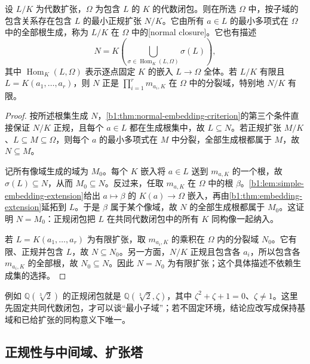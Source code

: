 \begin{proposition}\label{b1:prop:normal-closure}
	设 \(L/K\) 为代数扩张，\(\Omega\) 为包含 \(L\) 的 \(K\) 的代数闭包。则在所选 \(\Omega\) 中，按子域的包含关系存在包含 \(L\) 的最小正规扩张 \(N/K\)。它由所有 \(a\in L\) 的最小多项式在 \(\Omega\) 中的全部根生成，称为 \(L/K\) 在 \(\Omega\) 中的[normal closure]。它也有描述
	\[
		N=K\left(\bigcup_{\sigma\in\operatorname{Hom}_K(L,\Omega)}\sigma(L)\right),
	\]
	其中 \(\operatorname{Hom}_K(L,\Omega)\) 表示逐点固定 \(K\) 的嵌入 \(L\rightarrow\Omega\) 全体。若 \(L/K\) 有限且 \(L=K(a_1,\ldots,a_r)\)，则 \(N\) 正是 \(\prod_{i=1}^r m_{a_i,K}\) 在 \(\Omega\) 中的分裂域，特别地 \(N/K\) 有限。
\end{proposition}
\begin{proof}
	按所述根集生成 \(N\)，\cref{b1:thm:normal-embedding-criterion}的第三个条件直接保证 \(N/K\) 正规，且每个 \(a\in L\) 都在生成根集中，故 \(L\subseteq N\)。若正规扩张 \(M/K\)、\(L\subseteq M\subseteq\Omega\)，则每个 \(a\) 的最小多项式在 \(M\) 中分裂，全部生成根都属于 \(M\)，故 \(N\subseteq M\)。

	记所有像域生成的域为 \(M_0\)。每个 \(K\) 嵌入将 \(a\in L\) 送到 \(m_{a,K}\) 的一个根，故 \(\sigma(L)\subseteq N\)，从而 \(M_0\subseteq N\)。反过来，任取 \(m_{a,K}\) 在 \(\Omega\) 中的根 \(\beta\)。\cref{b1:lem:simple-embedding-extension}给出 \(a\mapsto\beta\) 的 \(K(a)\rightarrow\Omega\) 嵌入，再由\cref{b1:thm:embedding-extension}延拓到 \(L\)。于是 \(\beta\) 属于某个像域，故 \(N\) 的全部生成根都属于 \(M_0\)。这证明 \(N=M_0\)：正规闭包把 \(L\) 在共同代数闭包中的所有 \(K\) 同构像一起纳入。

	若 \(L=K(a_1,\ldots,a_r)\) 为有限扩张，取 \(m_{a_i,K}\) 的乘积在 \(\Omega\) 内的分裂域 \(N_0\)。它有限、正规并包含 \(L\)，故 \(N\subseteq N_0\)。另一方面，\(N/K\) 正规且包含各 \(a_i\)，所以包含各 \(m_{a_i,K}\) 的全部根，故 \(N_0\subseteq N\)。因此 \(N=N_0\) 为有限扩张；这个具体描述不依赖生成集的选择。
\end{proof}
例如 \(\mathbb Q(\sqrt[3]2)\) 的正规闭包就是 \(\mathbb Q(\sqrt[3]2,\zeta)\)，其中 \(\zeta^2+\zeta+1=0\)、\(\zeta\neq1\)。这里先固定共同代数闭包，才可以谈“最小子域”；若不固定环境，结论应改写成保持基域和已给扩张的同构意义下唯一。

\subsection{正规性与中间域、扩张塔}
\label{b1:subsec:1503:03}

